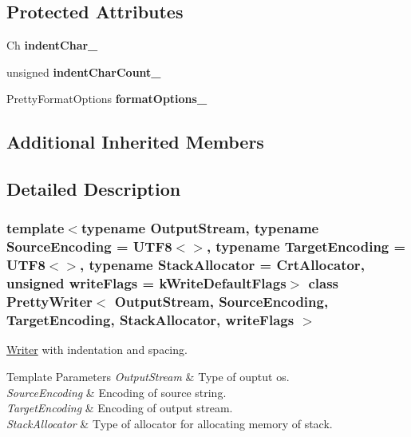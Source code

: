 \subsection*{Protected Attributes}
\begin{DoxyCompactItemize}
\item 
\mbox{\label{class_pretty_writer_aaa3f6380daa8466a5101ed18fc33bf04}} 
Ch {\bfseries indent\+Char\+\_\+}
\item 
\mbox{\label{class_pretty_writer_a7d00b9716ef3cd7e34ae1b744c968f13}} 
unsigned {\bfseries indent\+Char\+Count\+\_\+}
\item 
\mbox{\label{class_pretty_writer_a15505ed4ea0fa85d339b3a987f1a3aaf}} 
Pretty\+Format\+Options {\bfseries format\+Options\+\_\+}
\end{DoxyCompactItemize}
\subsection*{Additional Inherited Members}


\subsection{Detailed Description}
\subsubsection*{template$<$typename Output\+Stream, typename Source\+Encoding = U\+T\+F8$<$$>$, typename Target\+Encoding = U\+T\+F8$<$$>$, typename Stack\+Allocator = Crt\+Allocator, unsigned write\+Flags = k\+Write\+Default\+Flags$>$\newline
class Pretty\+Writer$<$ Output\+Stream, Source\+Encoding, Target\+Encoding, Stack\+Allocator, write\+Flags $>$}

\hyperlink{class_writer}{Writer} with indentation and spacing. 


\begin{DoxyTemplParams}{Template Parameters}
{\em Output\+Stream} & Type of ouptut os. \\
\hline
{\em Source\+Encoding} & Encoding of source string. \\
\hline
{\em Target\+Encoding} & Encoding of output stream. \\
\hline
{\em Stack\+Allocator} & Type of allocator for allocating memory of stack. \\
\hline
\end{DoxyTemplParams}


